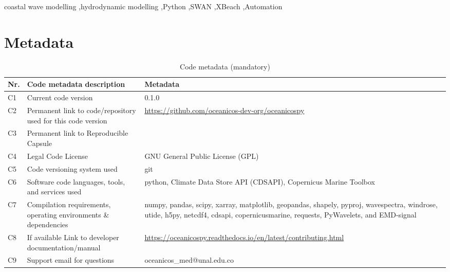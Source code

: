 \documentclass[preprint,12pt, a4paper]{elsarticle}
\begin{document}
\begin{frontmatter}
\begin{abstract}
\end{abstract}

\begin{keyword}
coastal wave modelling \sep hydrodynamic modelling \sep Python \sep SWAN \sep XBeach \sep Automation



\end{keyword}

\end{frontmatter}

\linenumbers

\section*{Metadata}
\label{}
\begin{table}[!h]
\begin{tabular}{|l|p{6.5cm}|p{6.5cm}|}
\hline
\textbf{Nr.} & \textbf{Code metadata description} & \textbf{Metadata} \\
\hline
C1 & Current code version & 0.1.0 \\
\hline
C2 & Permanent link to code/repository used for this code version & \url{https://github.com/oceanicos-dev-org/oceanicospy} \\
\hline
C3  & Permanent link to Reproducible Capsule & 
\\
\hline
C4 & Legal Code License   & GNU General Public License (GPL) \\
\hline
C5 & Code versioning system used & git \\
\hline
C6 & Software code languages, tools, and services used & python, Climate Data Store API (CDSAPI), Copernicus Marine Toolbox \\
\hline
C7 & Compilation requirements, operating environments \& dependencies & numpy, pandas, scipy, xarray, matplotlib, geopandas, shapely, pyproj, wavespectra, windrose, utide, h5py, netcdf4, cdsapi, copernicusmarine, requests, PyWavelets, and EMD-signal \\
\hline
C8 & If available Link to developer documentation/manual & \url{https://oceanicospy.readthedocs.io/en/latest/contributing.html} \\
\hline
C9 & Support email for questions & oceanicos\_med@unal.edu.co \\
\hline
\end{tabular}
\caption{Code metadata (mandatory)}
\label{codeMetadata} 
\end{table}
\end{document}
